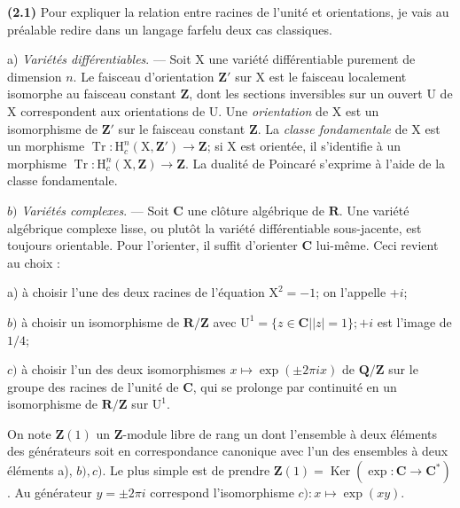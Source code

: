 \documentclass[10pt,leqno]{article}
\begin{document}
\noindent \textbf{(2.1)} Pour expliquer la relation entre racines de l’unité et orientations, je vais au préalable redire dans un langage farfelu deux cas classiques.\par

\noindent a) \emph{Variétés différentiables}. — Soit \(\mathrm{X}\) une variété différentiable purement de dimension \(n\). Le faisceau d’orientation \(\mathbf{Z}'\) sur \(\mathrm{X}\) est le faisceau localement isomorphe au faisceau constant \(\mathbf{Z}\), dont les sections inversibles sur un ouvert \(\mathrm{U}\) de \(\mathrm{X}\) correspondent aux orientations de \(\mathrm{U}\). Une \emph{orientation} de \(\mathrm{X}\) est un isomorphisme de \(\mathbf{Z}'\) sur le faisceau constant \(\mathbf{Z}\). La \emph{classe fondamentale} de \(\mathrm{X}\) est un morphisme \(\operatorname{Tr} : \mathrm{H}_{c}^{n}(\mathrm{X},\mathbf{Z}')\longrightarrow \mathbf{Z}\); si \(\mathrm{X}\) est orientée, il s’identifie à un morphisme \(\operatorname{Tr} : \mathrm{H}_{c}^{n}(\mathrm{X},\mathbf{Z})\longrightarrow \mathbf{Z}\). La dualité de Poincaré s’exprime à l’aide de la classe fondamentale.\par

\noindent \(b)\) \emph{Variétés complexes}. — Soit \(\mathbf{C}\) une clôture algébrique de \(\mathbf{R}\). Une variété algébrique complexe lisse, ou plutôt la variété différentiable sous-jacente, est toujours orientable. Pour l’orienter, il suffit d’orienter \(\mathbf{C}\) lui-même. Ceci revient au choix :\par

\noindent a) à choisir l’une des deux racines de l’équation \(\mathrm{X}^{2}=- 1\); on l’appelle +\(i\);\par

\noindent \(b)\) à choisir un isomorphisme de \(\mathbf{R}/\mathbf{Z}\) avec \(\mathrm{U}^{1}=\{z\in \mathbf{C} | |z|=1\}; +i\) est l’image de \(1/4\);\par

\noindent \(c)\) à choisir l’un des deux isomorphismes \(x\longmapsto \operatorname{exp}(\pm 2\pi ix)\) de \(\mathbf{Q}/\mathbf{Z}\) sur le groupe des racines de l’unité de \(\mathbf{C}\), qui se prolonge par continuité en un isomorphisme de \(\mathbf{R}/\mathbf{Z}\) sur \(\mathrm{U}^{1}\).\par

\noindent On note \(\mathbf{Z}(1)\) un \(\mathbf{Z}\)-module libre de rang un dont l’ensemble à deux éléments des générateurs soit en correspondance canonique avec l’un des ensembles à deux éléments a), \(b), c)\). Le plus simple est de prendre \(\mathbf{Z}(1)=\operatorname{Ker}(\operatorname{exp} : \mathbf{C}\longrightarrow \mathbf{C}^{*})\). Au générateur \(y=\pm 2\pi i\) correspond l’isomorphisme \(c) : x\longmapsto \operatorname{exp}(xy)\).\par
\end{document}

